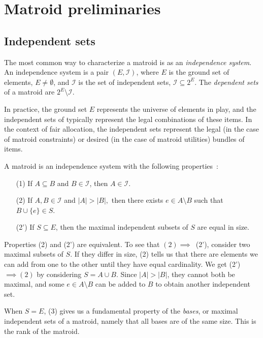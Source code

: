 \section{Matroid preliminaries}
\label{sec:matroid-theory}

\subsection*{Independent sets}
The most common way to characterize a matroid is as an \textit{independence system}. An independence system is a pair $(E, \mathcal{I})$, where $E$ is the ground set of elements, $E \not= \emptyset$, and $\mathcal{I}$ is the set of independent sets, $\mathcal{I} \subseteq 2^E$. The \textit{dependent sets} of a matroid are $2^E \setminus \mathcal{I}$. 

In practice, the ground set $E$ represents the universe of elements in play, and the independent sets of typically represent the legal combinations of these items. In the context of fair allocation, the independent sets represent the legal (in the case of matroid constraints) or desired (in the case of matroid utilities) bundles of items.

A matroid is an independence system with the following properties~\cite{whitney-1935}:
\begin{enumerate}
  \item[(1)] If $A \subseteq B$ and $B \in \mathcal{I}$, then $A \in \mathcal{I}$.
  \item[(2)] If $A, B \in \mathcal{I}$ and $|A| > |B|,$ then there exists $e \in A \setminus B$ such that $B \cup \{e\} \in S$.
  \item[(2')] If $S \subseteq E$, then the maximal independent subsets of $S$ are equal in size.
\end{enumerate}
Properties (2) and (2') are equivalent. To see that $(2) \implies$~(2'), consider two maximal subsets of $S$. If they differ in size, (2) tells us that there are elements we can add from one to the other until they have equal cardinality. We get (2')~$\implies (2)$ by considering $S = A \cup B$. Since $|A|>|B|$, they cannot both be maximal, and some $e \in A \setminus B$ can be added to $B$ to obtain another independent set.

When $S=E$, (3) gives us a fundamental property of the \textit{bases}, or maximal independent sets of a matroid, namely that all bases are of the same size. This is the rank of the matroid.


